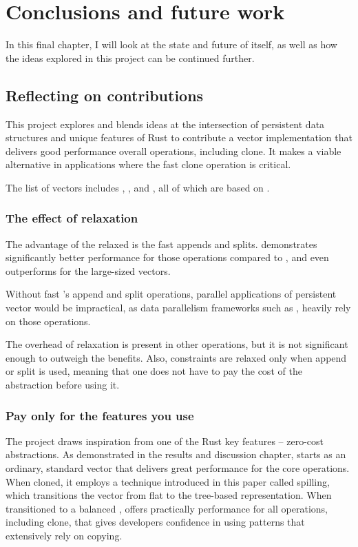 \chapter{Conclusions and future work}
In this final chapter, I will look at the state and future of \pvecrs{} itself, as well as how the ideas explored in this project can be continued further.

\section{Reflecting on contributions}
This project explores and blends ideas at the intersection of persistent data structures and unique features of Rust to contribute a vector implementation that delivers good performance overall operations, including clone. It makes \pvecrs{} a viable alternative in applications where the fast clone operation is critical. 

The list of vectors includes \rbvec{}, \rrbvec{}, and \pvec{}, all of which are based on \rrbtree{}. 

\subsection{The effect of relaxation}
The advantage of the relaxed \rbtree{} is the fast appends and splits. \rrbvec{} demonstrates significantly better performance for those operations compared to \rbvec{}, and even outperforms \stdvec{} for the large-sized vectors. 

Without fast \rrbvec{}'s append and split operations, parallel applications of persistent vector would be impractical, as data parallelism frameworks such as \rayon{}, heavily rely on those operations. 

The overhead of relaxation is present in other operations, but it is not significant enough to outweigh the benefits. Also, constraints are relaxed only when append or split is used, meaning that one does not have to pay the cost of the abstraction before using it. 

\subsection{Pay only for the features you use}
The project draws inspiration from one of the Rust key features -- zero-cost abstractions. As demonstrated in the results and discussion chapter, \pvec{} starts as an ordinary, standard vector that delivers great performance for the core operations. When cloned, it employs a technique introduced in this paper called spilling, which transitions the vector from flat to the tree-based representation. When transitioned to a balanced \rrbvec{}, \pvec{} offers practically  performance for all operations, including clone, that gives developers confidence in using patterns that extensively rely on copying. 

